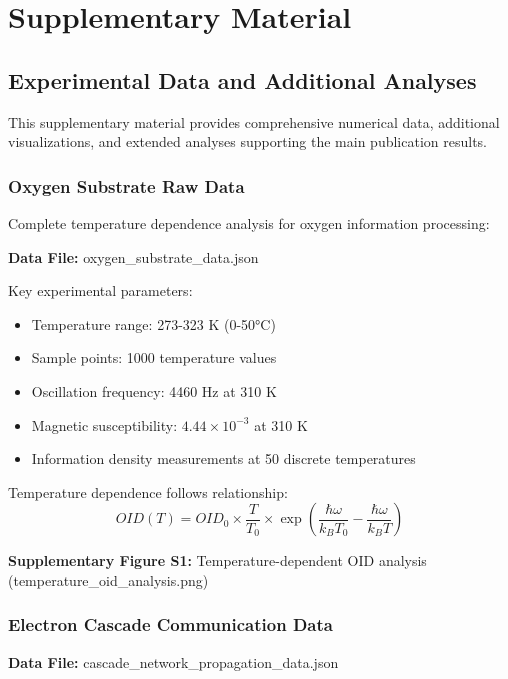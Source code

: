 
\section{Supplementary Material}

\subsection{Experimental Data and Additional Analyses}

This supplementary material provides comprehensive numerical data, additional visualizations, and extended analyses supporting the main publication results.

\subsubsection{Oxygen Substrate Raw Data}

Complete temperature dependence analysis for oxygen information processing:

\textbf{Data File:} oxygen\_substrate\_data.json

Key experimental parameters:
\begin{itemize}
    \item Temperature range: 273-323 K (0-50°C)
    \item Sample points: 1000 temperature values
    \item Oscillation frequency: 4460 Hz at 310 K
    \item Magnetic susceptibility: $4.44 \times 10^{-3}$ at 310 K
    \item Information density measurements at 50 discrete temperatures
\end{itemize}

Temperature dependence follows relationship:
\begin{equation}
OID(T) = OID_0 \times \frac{T}{T_0} \times \exp\left(\frac{\hbar \omega}{k_B T_0} - \frac{\hbar \omega}{k_B T}\right)
\end{equation}

\textbf{Supplementary Figure S1:} Temperature-dependent OID analysis (temperature\_oid\_analysis.png)

\subsubsection{Electron Cascade Communication Data}

\textbf{Data File:} cascade\_network\_propagation\_data.json


